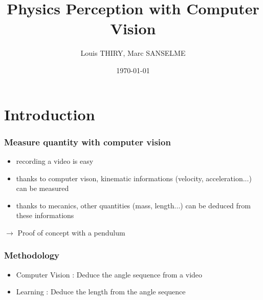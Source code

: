 \documentclass{beamer}
\title[Project Object Recognition]{Physics Perception with Computer Vision}
\author{Louis THIRY, Marc SANSELME}
\institute[MVA]
{ENS-Cachan}
\date{\today}
\begin{document}
\begin{frame}
\titlepage
\end{frame}



\section{Introduction}

\begin{frame}
\frametitle{Measure quantity with computer vision}
\begin{itemize}
  \item recording a video is easy
  \item thanks to computer vison, kinematic informations (velocity, acceleration...) can be measured
  \item thanks to mecanics, other quantities (mass, length...) can be deduced from these informations
\end{itemize}
$\rightarrow$ Proof of concept with a pendulum
\end{frame}


\begin{frame}
\frametitle{Methodology}
\begin{itemize}
  \item Computer Vision : Deduce the angle sequence from a video
  \item Learning : Deduce the length from the angle sequence
\end{itemize}
\end{frame}
\end{document}
